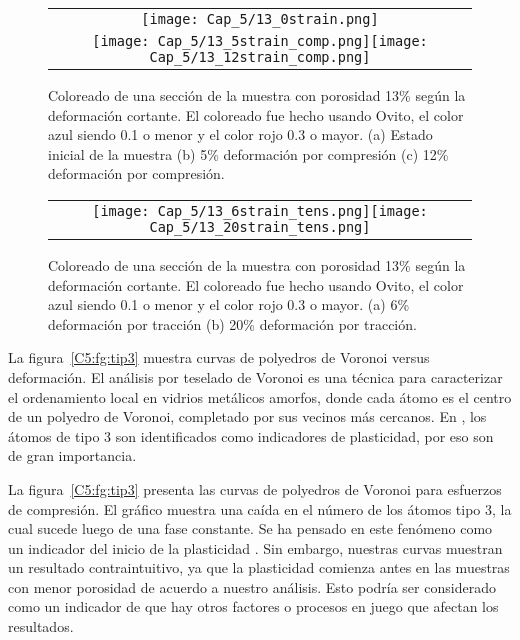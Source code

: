 \begin{figure}[h!]
  \centering
  \begin{tabular}{c}
    \texttt{[image: Cap\_5/13\_0strain.png]} \\
    \texttt{[image: Cap\_5/13\_5strain\_comp.png]}\texttt{[image: Cap\_5/13\_12strain\_comp.png]} \\
  \end{tabular}
  \caption[Coloreado de una sección de la muestra con porosidad 13\% según la deformación cortante.]{Coloreado de una sección de la muestra con
  porosidad 13\% según la deformación cortante. El coloreado fue hecho usando Ovito, el color azul siendo 0.1 o menor y el color rojo 0.3 o mayor.
  (a) Estado inicial de la muestra (b) 5\% deformación por compresión (c) 12\% deformación por compresión.}
  \label{C5:fg:ss_comp}
\end{figure}

\begin{figure}[h!]
  \centering
  \begin{tabular}{c}
    \texttt{[image: Cap\_5/13\_6strain\_tens.png]}\texttt{[image: Cap\_5/13\_20strain\_tens.png]} \\
  \end{tabular}
  \caption[Coloreado de una sección de la muestra con porosidad 13\% según la deformación cortante.]{Coloreado de una sección de la muestra con
  porosidad 13\% según la deformación cortante. El coloreado fue hecho usando Ovito, el color azul siendo 0.1 o menor y el color rojo 0.3 o
  mayor. (a) 6\% deformación por tracción (b) 20\% deformación por tracción.}
  \label{C5:fg:ss_tens}
\end{figure}

La figura~\ref{C5:fg:tip3} muestra curvas de polyedros de Voronoi versus deformación. El análisis por teselado de Voronoi es una técnica para
caracterizar el ordenamiento local en vidrios metálicos amorfos, donde cada átomo es el centro de un polyedro de Voronoi,
completado por sus vecinos más cercanos. En \cite{arman10}, los átomos de tipo 3 son identificados como indicadores de plasticidad, por eso
son de gran importancia.

La figura~\ref{C5:fg:tip3}  presenta las curvas de polyedros de Voronoi para esfuerzos de compresión. El gráfico muestra una caída en el número
de los átomos tipo 3, la cual sucede luego de una fase constante. Se ha pensado en este fenómeno como un indicador del inicio de la plasticidad
\citep{arman10}. Sin embargo, nuestras curvas muestran un resultado contraintuitivo, ya que la plasticidad comienza antes en las muestras con menor
porosidad de acuerdo a nuestro análisis. Esto podría ser considerado como un indicador de que hay otros factores o procesos en juego que afectan
los resultados.

